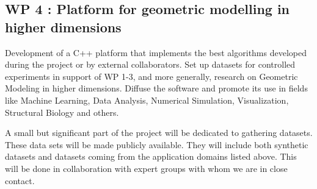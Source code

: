 \subsection*{WP 4 :  Platform for geometric modelling in higher dimensions}
Development of a C++ platform that implements the best algorithms developed during the project or by external collaborators. Set up datasets for controlled experiments in support of WP 1-3, and more generally, research on Geometric Modeling in higher dimensions.  Diffuse the software and promote its use in fields like Machine Learning, Data Analysis, Numerical Simulation, Visualization, Structural Biology and others. 

A small but significant part of the project will be dedicated to gathering datasets. These data sets will be made publicly available. %
They will include both synthetic datasets and datasets coming from the application domains listed above. This will be done in collaboration with expert groups with whom we are in close contact.
